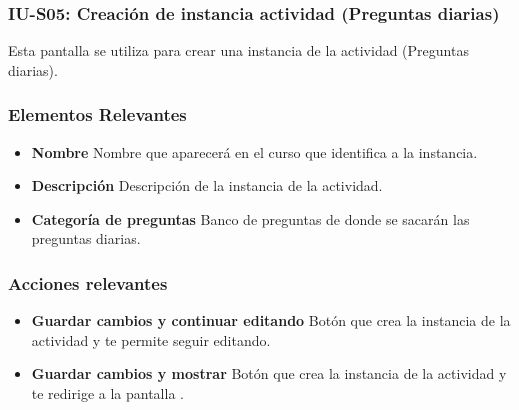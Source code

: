 
\subsubsection{IU-S05: Creación de instancia actividad (Preguntas diarias)}

    Esta pantalla se utiliza para crear una instancia de la actividad (Preguntas diarias).


\subsubsection{Elementos Relevantes}

    \begin{itemize}
    \item {\bf Nombre}
        Nombre que aparecerá en el curso que identifica a la instancia.
    \item {\bf Descripción}
        Descripción de la instancia de la actividad.

    \item {\bf Categoría de preguntas }
        Banco de preguntas de donde se sacarán las preguntas diarias.
    \end{itemize}

\subsubsection{Acciones relevantes}

    \begin{itemize}
    \item {\bf Guardar cambios y continuar editando}
        Botón que crea la instancia de la actividad y te permite seguir editando.
    \item {\bf Guardar cambios y mostrar}
        Botón que crea la instancia de la actividad y te redirige a la pantalla .
    \end{itemize}

\clearpage
